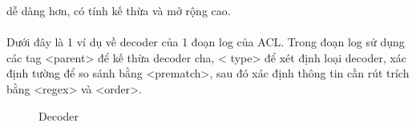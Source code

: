 	dễ dàng hơn, có tính kế thừa và mở rộng cao.\\\\
	 Dưới đây là 1 ví dụ về decoder của 1 đoạn log của ACL. Trong đoạn log sử dụng
  các tag \textless parent\textgreater{} để kế thừa decoder cha, \textless
  type\textgreater{} để xét định loại decoder, xác định tường để so sánh bằng
  \textless prematch\textgreater, sau đó xác định thông tin cần rút trích bằng \textless regex\textgreater{} và
  \textless order\textgreater.
	\begin{figure}[h!]
	\centering 
{}
	\caption{Decoder}
  \end{figure}
 
